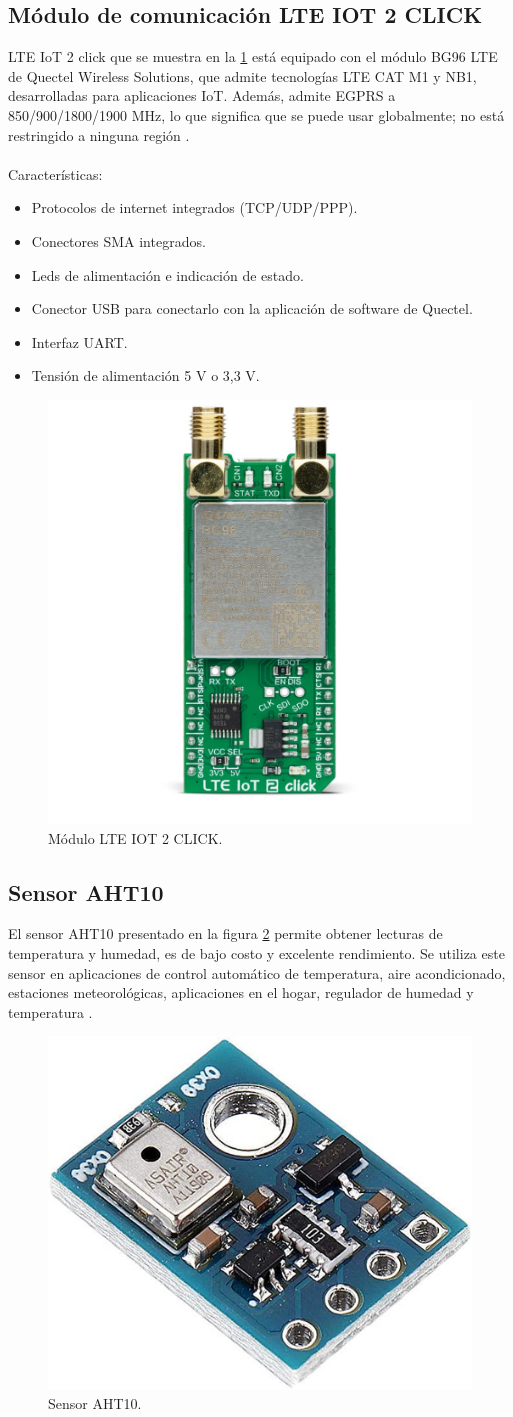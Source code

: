 \subsection{Módulo de comunicación LTE IOT 2 CLICK}
\label{subsec:ejemplo}
LTE IoT 2 click que se muestra en la \ref{fig:modulo LTE IOT} está equipado con el módulo BG96 LTE de Quectel Wireless Solutions, que admite tecnologías LTE CAT M1 y NB1, desarrolladas para aplicaciones IoT. Además, admite EGPRS a 850/900/1800/1900 MHz, lo que significa que se puede usar globalmente; no está restringido a ninguna región \citep{MonuloLTE-IOT}.
\\ 
\\Características:
\begin{itemize}
	\item Protocolos de internet integrados (TCP/UDP/PPP).
	\item Conectores SMA integrados.
	\item Leds de alimentación e indicación de estado.
	\item Conector USB para conectarlo con la aplicación de software de Quectel.
	\item Interfaz UART. 
	\item Tensión de alimentación 5 V o 3,3 V.

\end{itemize}


\begin{figure}[htbp]
	\centering
	\includegraphics[width=.4\textwidth]{./Figures/moduloBG96.jpg}
	\caption{Módulo LTE IOT 2 CLICK.}
	\label{fig:modulo LTE IOT}
\end{figure}
\subsection{Sensor AHT10}
El sensor AHT10 presentado en la figura \ref{fig:SensorAHT10} permite obtener lecturas de temperatura y humedad, es de bajo costo y excelente rendimiento. Se utiliza este sensor en aplicaciones de control automático de temperatura, aire acondicionado, estaciones meteorológicas, aplicaciones en el hogar, regulador de humedad y temperatura \citep{ModuloAHT10}.
\begin{figure}[htbp]
	\centering
	\includegraphics[width=.3\textwidth]{./Figures/aht10.jpg}
	\caption{Sensor AHT10.}
	\label{fig:SensorAHT10}
\end{figure}

